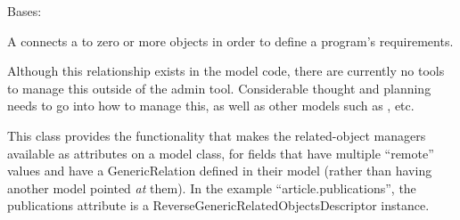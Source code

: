\documentclass[letterpaper,10pt,english]{sphinxmanual}
\begin{document}
\begin{fulllineitems}
\label{generated/apps.profiles.models:apps.profiles.models.Requirement}
Bases: {\hyperref[generated/apps.profiles.models:apps.profiles.models.BaseModel]{}}

A  connects a  to zero or more  objects
in order to define a program's requirements.

Although this relationship exists in the model code, there are currently
no tools to manage this outside of the admin tool.  Considerable thought and
planning needs to go into how to manage this, as well as other models such
as , etc.


\begin{fulllineitems}
\label{generated/apps.profiles.models:apps.profiles.models.Requirement.unit_permissions}
This class provides the functionality that makes the related-object
managers available as attributes on a model class, for fields that have
multiple ``remote'' values and have a GenericRelation defined in their model
(rather than having another model pointed \emph{at} them). In the example
``article.publications'', the publications attribute is a
ReverseGenericRelatedObjectsDescriptor instance.

\end{fulllineitems}


\end{fulllineitems}


\end{document}
